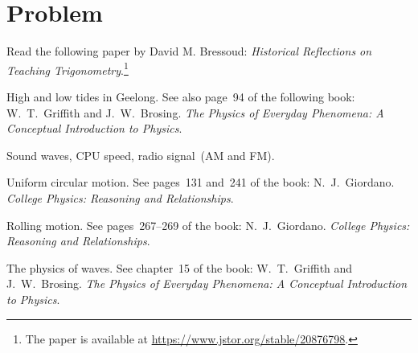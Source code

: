 \documentclass[a4paper,oneside,12pt]{article}
\begin{document}
\newpage

\section*{Problem}

\begin{problem}
\item Read the following paper by David M. Bressoud:
  \emph{Historical Reflections on Teaching Trigonometry}.\footnote{
    The paper is available at
    \url{https://www.jstor.org/stable/20876798}.
  }

\item High and low tides in Geelong.  See also page~94 of the
  following book: W.~T.~Griffith and J.~W.~Brosing.  \emph{The Physics
    of Everyday Phenomena: A Conceptual Introduction to Physics}.

\item Sound waves, CPU speed, radio signal~(AM and FM).

\item Uniform circular motion.  See pages~131 and~241 of the book:
  N.~J.~Giordano.  \emph{College Physics: Reasoning and Relationships}.

\item Rolling motion.  See pages~267--269 of the book:
  N.~J.~Giordano.  \emph{College Physics: Reasoning and Relationships}.

\item The physics of waves.  See chapter~15 of the book:
  W.~T.~Griffith and J.~W.~Brosing.  \emph{The Physics of Everyday
    Phenomena: A Conceptual Introduction to Physics}.


\end{problem}
\end{document}
